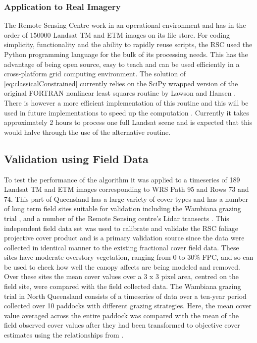 \documentclass[remotesensing,article,accept,moreauthors,pdftex,12pt,a4paper]{mdpi}
\begin{document}
\subsubsection{Application to Real Imagery}

The Remote Sensing Centre work in an operational environment and has in the order of 150000 Landsat TM and ETM images on its file store. For coding simplicity, functionality and the ability to rapidly reuse scripts, the RSC used the Python programming language for the bulk of its processing needs. This has the advantage of being open source, easy to teach and can be used efficiently in a cross-platform grid computing environment. The solution of \ref{eq:classicalConstrained} currently relies on the SciPy \citep{Jones2001} wrapped version of the original FORTRAN nonlinear least squares routine by Lawson and Hansen \citep{Lawson1995}. There is however a more efficient implementation of this routine and this will be used in future implementations to speed up the computation \citep{Bro1997}. Currently it takes approximately 2 hours to process one full Landsat scene and is expected that this would halve through the use of the alternative routine. 
%
%



\subsection{Validation using Field Data}

To test the performance of the algorithm it was applied to a timeseries of 189 Landsat TM and ETM images corresponding to WRS Path 95 and Rows 73 and 74. This part of Queensland has a large variety of cover types and has a number of long term field sites suitable for validation including the Wambiana grazing trial \citep{O'Reagain2009}, and a number of the Remote Sensing centre's Lidar transects \citep{Armston2009}. This independent field data set was used to calibrate and validate the RSC foliage projective cover product and is a primary validation source since the data were collected in identical manner to the existing fractional cover field data. These sites have moderate overstory vegetation, ranging from 0 to 30\% FPC, and so can be used to check how well the canopy affects are being modeled and removed. Over these sites the mean cover values over a 3 x 3 pixel area, centred on the field site, were compared with the field collected data. The Wambiana grazing trial in North Queensland consists of a timeseries of data over a ten-year period collected over 10 paddocks with different grazing strategies. Here, the mean cover value averaged across the entire paddock was compared with the mean of the field observed cover values after they had been transformed to objective cover estimates using the relationships from \citep{Murphy2002}. 
\end{document}
